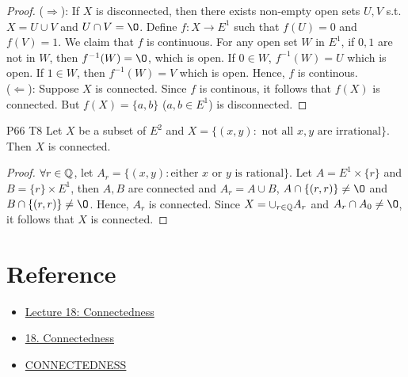 \begin{proof}
    ($\Rightarrow$): If $X$ is disconnected, then there exists non-empty open sets $U,V$ s.t. 
    $X=U\cup V$ and $U\cap V=\O$. Define $f:X\rightarrow E^1$ such that $f(U)=0$ and $f(V)=1$.
    We claim that $f$ is continuous. For any open set $W$ in $E^1$, 
    if $0,1$ are not in $W$, then $f^{-1}(W)=\O$, which is open. If $0\in W$, $f^{-1}(W)=U$ which is open. 
    If $1\in W$, then $f^{-1}(W)=V$ which is open. Hence, $f$ is continous.
    \\
    ($\Leftarrow$): Suppose $X$ is connected. Since $f$ is continous, it follows that $f(X)$ is connected.
    But $f(X)=\{a,b\}$ ($a,b\in E^1$) is disconnected. 
\end{proof}

\begin{exercise}{P66 T8}{}
    Let $X$ be a subset of $E^2$ and $X=\{(x,y): \text{ not all } x,y \text{ are irrational} \}$.
    Then $X$ is connected.  
\end{exercise}

\begin{proof}
    $\forall r\in \mathbb{Q}$, let $A_r=\{(x,y):\text{either }x \text{ or } y \text{ is rational}\}$. 
    Let $A=E^1\times \{r\}$ and $B=\{r\}\times E^1$, then $A,B$ are connected and $A_r=A\cup B$, $A\cap \{(r,r)\}\neq \O$ and $B\cap \{(r,r)\}\neq \O$. 
    Hence, $A_r$ is connected. Since $X=\cup_{r\in \mathbb{Q}} A_r$ and $A_r\cap A_0\neq \O$, it follows that $X$ is connected.
\end{proof}


\section{Reference}

\begin{itemize}
    \item \href{https://ece.iisc.ac.in/~parimal/2015/proofs/lecture-18.pdf}{Lecture 18: Connectedness}
    \item \href{https://www.math.toronto.edu/ivan/mat327/docs/notes/18-connected.pdf}{18. Connectedness}
    \item \href{http://staff.ustc.edu.cn/~wangzuoq/Courses/21S-Topology/Notes/Lec16.pdf}{CONNECTEDNESS}
\end{itemize}
